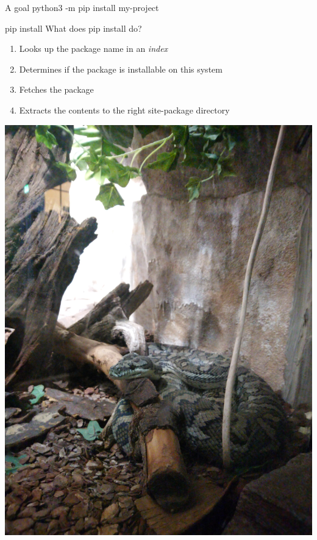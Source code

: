 \documentclass[pdf]{beamer}
\begin{document}
\begin{frame}{A goal}
    python3 -m pip install my-project

\end{frame}

\begin{frame}{pip install}
    What does pip install do?

    \begin{enumerate}
        \item Looks up the package name in an \emph{index}
        \item Determines if the package is installable on this system
        \item Fetches the package
        \item Extracts the contents to the right site-package directory
    \end{enumerate}
\end{frame}

\begin{frame}
    \begin{center}
    \includegraphics[keepaspectratio, height = 0.9\textheight]{snake.jpg}
    \end{center}
\end{frame}
\end{document}
